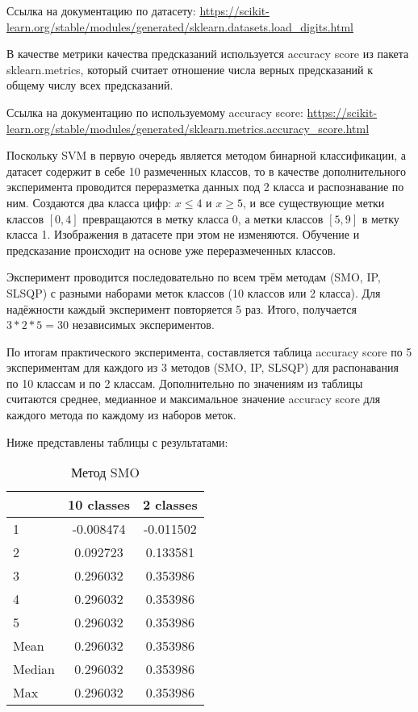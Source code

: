 \documentclass[12pt,a4paper]{article}
\begin{document}
Ссылка на документацию по датасету: \url{https://scikit-learn.org/stable/modules/generated/sklearn.datasets.load_digits.html}

В качестве метрики качества предсказаний используется accuracy score из пакета sklearn.metrics, который считает отношение числа верных предсказаний к общему числу всех предсказаний.

Ссылка на документацию по используемому accuracy score: \url{https://scikit-learn.org/stable/modules/generated/sklearn.metrics.accuracy_score.html} 

Поскольку SVM в первую очередь является методом бинарной классификации, а датасет содержит в себе 10 размеченных классов, то в качестве дополнительного эксперимента проводится переразметка данных под 2 класса и распознавание по ним. Создаются два класса цифр: $x \leq 4$ и $x \geq 5$, и все существующие метки классов $[0, 4]$ превращаются в метку класса 0, а метки классов $[5, 9]$ в метку класса 1. Изображения в датасете при этом не изменяются. Обучение и предсказание происходит на основе уже переразмеченных классов.

Эксперимент проводится последовательно по всем трём методам (SMO, IP, SLSQP) с разными наборами меток классов (10 классов или 2 класса). Для надёжности каждый эксперимент повторяется 5 раз. Итого, получается $3 * 2 * 5 = 30$ независимых экспериментов.

По итогам практического эксперимента, составляется таблица accuracy score по 5 экспериментам для каждого из 3 методов (SMO, IP, SLSQP) для распонавания по 10 классам и по 2 классам. Дополнительно по значениям из таблицы считаются среднее, медианное и максимальное значение accuracy score для каждого метода по каждому из наборов меток.

Ниже представлены таблицы с результатами:

\begin{table}[H]
    \centering
    \begin{tabular}{|l||c|c|}
        \hline
        & 10 classes & 2 classes \\\hline\hline
        1 & -0.008474 & -0.011502 \\\hline
        2 & 0.092723 & 0.133581 \\\hline
        3 & 0.296032 & 0.353986 \\\hline
        4 & 0.296032 & 0.353986 \\\hline
        5 & 0.296032 & 0.353986 \\\hline
        Mean & 0.296032 & 0.353986 \\\hline
        Median & 0.296032 & 0.353986 \\\hline
        Max & 0.296032 & 0.353986 \\\hline
    \end{tabular}
    \caption{Метод SMO}
\end{table}
\end{document}
